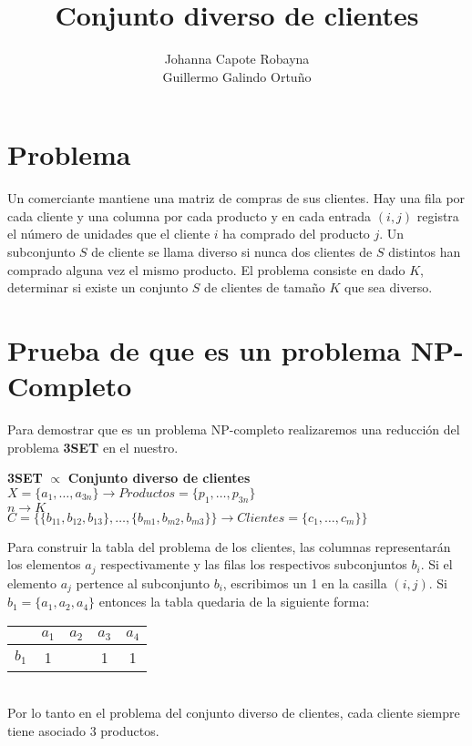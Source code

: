 \documentclass[11pt]{article}
\title{\textbf{Conjunto diverso de clientes}}
\author{Johanna Capote Robayna\\
		Guillermo Galindo Ortuño}
\date{}
\begin{document}
\maketitle

\section*{Problema}
Un comerciante mantiene una matriz de compras de sus clientes. Hay una fila por cada cliente y una columna por cada producto y en cada entrada $(i,j)$ registra el número de unidades que el cliente $i$ ha comprado del producto $j$. Un subconjunto $S$ de cliente se llama diverso si nunca dos clientes de $S$ distintos han comprado alguna vez el mismo producto. El problema consiste en dado $K$, determinar si existe un conjunto $S$ de clientes de tamaño $K$ que sea diverso. \\
\section*{Prueba de que es un problema NP-Completo}
Para demostrar que es un problema NP-completo realizaremos una reducción del problema \textbf{3SET} en el nuestro.

\begin{center}
\textbf{3SET} $\propto$ \textbf{Conjunto diverso de clientes} \\
$X = \{ a_1, \dots, a_{3n} \} \rightarrow  Productos = \{p_1, \dots , p_{3n} \}  $ \\
$ n \rightarrow K$ \\
$C = \Big\{ \{ b_{11},b_{12}, b_{13}\} , \dots , \{b_{m1}, b_{m2}, b_{m3} \} \Big\} \rightarrow Clientes = \{ c_1, \dots , c_m \} \}$
\end{center}

Para construir la tabla del problema de los clientes, las columnas representarán los elementos $a_j$ respectivamente y las filas los respectivos subconjuntos $b_i$. Si el elemento $a_j$ pertence al subconjunto  $b_i$, escribimos un 1 en la casilla $(i,j)$. Si $b_1 = \{ a_1, a_2, a_4 \} $ entonces la tabla quedaria de la siguiente forma:
\begin{table}[h]
\centering
\begin{tabular}{c|c|c|c|c|}
\cline{2-5}
                            & $a_1$ & $a_2$ & $a_3$ & $a_4$ \\ \hline
\multicolumn{1}{|c|}{$b_1$} & 1     &       & 1     & 1     \\ \hline
\end{tabular}
\end{table}
\\
Por lo tanto en el problema del conjunto diverso de clientes, cada cliente siempre tiene asociado 3 productos.
\\
\end{document}
